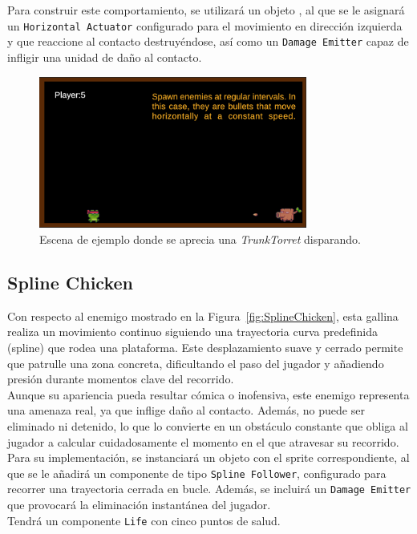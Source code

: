 Para construir este comportamiento, se utilizará un objeto , al que se le asignará un \texttt{Horizontal Actuator} configurado para el movimiento en dirección izquierda y que reaccione al contacto destruyéndose, así como un \texttt{Damage Emitter} capaz de infligir una unidad de daño al contacto. 


\begin{figure}[t]
	\centering
	\includegraphics[height=5cm]{Imagenes/TrunkTorret.png}
	\caption{Escena de ejemplo donde se aprecia una \textit{TrunkTorret} disparando.}
	\label{fig:TrunkTurret}
\end{figure}
\subsection{Spline Chicken}

Con respecto al enemigo mostrado en la Figura~\ref{fig:SplineChicken}, esta gallina realiza un movimiento continuo siguiendo una trayectoria curva predefinida (spline) que rodea una plataforma. Este desplazamiento suave y cerrado permite que patrulle una zona concreta, dificultando el paso del jugador y añadiendo presión durante momentos clave del recorrido.\\

Aunque su apariencia pueda resultar cómica o inofensiva, este enemigo representa una amenaza real, ya que inflige daño al contacto. Además, no puede ser eliminado ni detenido, lo que lo convierte en un obstáculo constante que obliga al jugador a calcular cuidadosamente el momento en el que atravesar su recorrido.\\

Para su implementación, se instanciará un objeto con el sprite correspondiente, al que se le añadirá un componente de tipo \texttt{Spline Follower}, configurado para recorrer una trayectoria cerrada en bucle. Además, se incluirá un \texttt{Damage Emitter} que provocará la eliminación instantánea del jugador.\\

Tendrá un componente \texttt{Life} con cinco puntos de salud.

